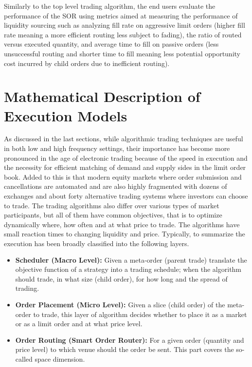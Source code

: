 Similarly to the top level trading algorithm, the end users evaluate the performance of the SOR using metrics aimed at measuring the performance of liquidity sourcing such as analyzing fill rate on aggressive limit orders (higher fill rate meaning a more efficient routing less subject to fading), the ratio of routed versus executed quantity, and average time to fill on passive orders (less unsuccessful routing and shorter time to fill meaning less potential opportunity cost incurred by child orders due to inefficient routing).



\section{Mathematical Description of Execution Models}


As discussed in the last sections, while algorithmic trading techniques are useful in both low and high frequency settings, their importance has become more pronounced in the age of electronic trading because of the speed in execution and the necessity for efficient matching of demand and supply sides in the limit order book. Added to this is that modern equity markets where order submission and cancellations are automated and are also highly fragmented with dozens of exchanges and about forty alternative trading systems where investors can choose to trade. The trading algorithms also differ over various types of market participants, but all of them have common objectives, that is to optimize dynamically where, how often and at what price to trade. The algorithms have small reaction times to changing liquidity and price. Typically, to summarize the execution has been broadly classified into the following layers.
	\begin{itemize}
	\item \textbf{Scheduler (Macro Level):} Given a meta-order (parent trade) translate the objective function of a strategy into a trading schedule; when the algorithm should trade, in what size (child order), for how long and the spread of trading.
	
	\item \textbf{Order Placement (Micro Level):} Given a slice (child order) of the meta-order to trade, this layer of algorithm decides whether to place it as a market or as a  limit order and at what price level.
	
	\item \textbf{Order Routing (Smart Order Router):} For a given order (quantity and price level) to which venue should the order be sent. This part covers the so-called space dimension.
	\end{itemize}


